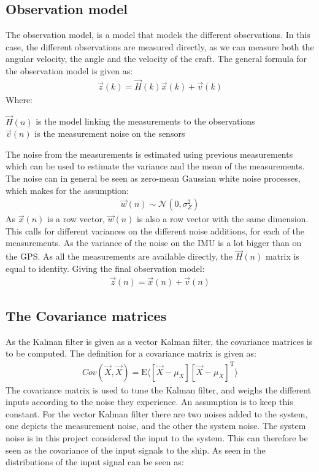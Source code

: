 \subsection{Observation model}
The observation model, is a model that models the different observations. In this case, the different observations are measured directly, as we can measure both the angular velocity, the angle and the velocity of the craft. The general formula for the observation model is given as:
\begin{align}
\vec{z}(k) = \vec{H}(k)\vec{x}(k) + \vec{v}(k)
\end{align}
\noindent Where:
\begin{ffk}
$\vec{H}(n)$ is the model linking the measurements to the observations\\
$\vec{v}(n)$ is the measurement noise on the sensors
\end{ffk}
The noise from the measurements is estimated using previous measurements which can be used to estimate the variance and the mean of the measurements. The noise can in general be seen as zero-mean Gaussian white noise processes, which makes for the assumption:
\begin{align}
\vec{w}(n) \sim \mathcal{N}(0,\sigma_Z^2)
\end{align}
As $\vec{x}(n)$ is a row vector, $\vec{w}(n)$ is also a row vector with the same dimension. This calls for different variances on the different noise additions, for each of the measurements. As the variance of the noise on the \ac{IMU} is a lot bigger than on the \ac{GPS}. As all the measurements are available directly, the $\vec{H}(n)$ matrix is equal to identity. Giving the final observation model:
\begin{align}
\vec{z}(n) = \vec{x}(n) + \vec{v}(n)
\end{align}


\subsection{The Covariance matrices}
As the Kalman filter is given as a vector Kalman filter, the covariance matrices is to be computed. The definition for a covariance matrix is given as:
\begin{align}
Cov(\vec{X},\vec{X}) = \text{E}\langle[\vec{X} - \mu_X][\vec{X} - \mu_X]^\text{T}\rangle
\end{align}
The covariance matrix is used to tune the Kalman filter, and weighs the different inputs according to the noise they experience. An assumption is to keep this constant. For the vector Kalman filter there are two noises added to the system, one depicts the measurement noise, and the other the system noise. The system noise is in this project considered the input to the system. This can therefore be seen as the covariance of the input signals to the ship. As seen in  the distributions of the input signal can be seen as:

